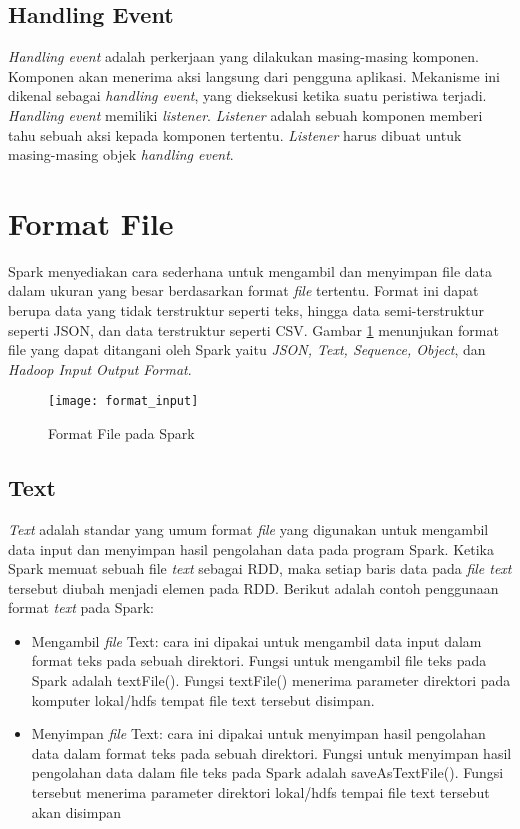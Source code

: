 \subsection{Handling Event}
\textit{Handling event} adalah perkerjaan yang dilakukan masing-masing komponen. Komponen akan menerima aksi langsung dari pengguna aplikasi. Mekanisme ini dikenal sebagai \textit{handling event}, yang dieksekusi ketika suatu peristiwa terjadi. \textit{Handling event} memiliki \textit{listener}. \textit{Listener} adalah sebuah komponen memberi tahu sebuah aksi kepada komponen tertentu. \textit{Listener} harus dibuat untuk masing-masing objek \textit{handling event}. 

\section{Format File}
Spark menyediakan cara sederhana untuk mengambil dan menyimpan file data dalam ukuran yang besar berdasarkan format \textit{file} tertentu. Format ini dapat berupa data yang tidak terstruktur seperti teks, hingga data semi-terstruktur seperti JSON, dan data terstruktur seperti CSV. Gambar \ref{fig:format_file} menunjukan format file yang dapat ditangani oleh Spark yaitu \textit{JSON, Text, Sequence, Object}, dan \textit{Hadoop Input Output Format}.

\begin{figure}[H]
	\centering
	\texttt{[image: format\_input]}
	\caption{Format File pada Spark}
	\label{fig:format_file}
\end{figure}

\subsection{Text}
\textit{Text} adalah standar yang umum format \textit{file} yang digunakan untuk mengambil data input dan menyimpan hasil pengolahan data pada program Spark. Ketika Spark memuat sebuah file \textit{text} sebagai RDD, maka setiap baris data pada \textit{file text} tersebut diubah menjadi elemen pada RDD. Berikut adalah contoh penggunaan format \textit{text} pada Spark:

\begin{itemize}

\item Mengambil \textit{file} Text: cara ini dipakai untuk mengambil data input dalam format teks pada sebuah direktori. Fungsi untuk mengambil file teks pada Spark adalah \textsf{textFile()}. Fungsi textFile() menerima parameter direktori pada komputer lokal/hdfs tempat file text tersebut disimpan.

\item Menyimpan \textit{file} Text: cara ini dipakai untuk menyimpan hasil pengolahan data dalam format teks pada sebuah direktori. Fungsi untuk menyimpan hasil pengolahan data dalam file teks pada Spark adalah \textsf{saveAsTextFile()}. Fungsi tersebut menerima parameter direktori lokal/hdfs tempai file text tersebut akan disimpan

\end{itemize}

